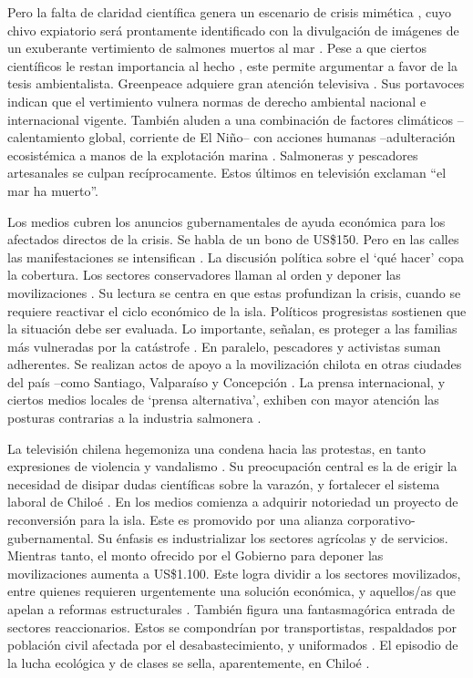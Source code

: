\documentclass{textolivre}
\begin{document}
Pero la falta de claridad científica genera un escenario de crisis mimética \cite{girard216}, 
cuyo chivo expiatorio será prontamente identificado con la divulgación de imágenes
de un exuberante vertimiento de salmones muertos al mar \cite{agenciaefe}. Pese a
que ciertos científicos le restan importancia al hecho \cite{buschmann2016}, este
permite argumentar a favor de la tesis ambientalista. Greenpeace adquiere gran atención
televisiva \cite{cnnchile2016b}. Sus portavoces indican que el vertimiento vulnera normas
de derecho ambiental nacional e internacional vigente. También aluden a una
combinación de factores climáticos --calentamiento global, corriente de El Niño-- con
acciones humanas --adulteración ecosistémica a manos de la explotación marina
\cite{Kamjunke2017}. Salmoneras y pescadores artesanales se culpan
recíprocamente. Estos últimos en televisión exclaman “el mar ha muerto”.

Los medios cubren los anuncios gubernamentales de ayuda económica para los
afectados directos de la crisis. Se habla de un bono de US\$150. Pero en las calles las
manifestaciones se intensifican \cite{24horasa,infante2016}. La discusión política
sobre el ‘qué hacer’ copa la cobertura. Los sectores conservadores llaman al orden y
deponer las movilizaciones \cite{agriculturatv}. Su lectura se centra en que estas
profundizan la crisis, cuando se requiere reactivar el ciclo económico de la isla. Políticos
progresistas sostienen que la situación debe ser evaluada. Lo importante, señalan, es
proteger a las familias más vulneradas por la catástrofe \cite{cooperativa2016}. En
paralelo, pescadores y activistas suman adherentes. Se realizan actos de apoyo a la
movilización chilota en otras ciudades del país --como Santiago, Valparaíso y Concepción
\cite{agenciaefe}. La prensa internacional, y ciertos medios locales de ‘prensa
alternativa’, exhiben con mayor atención las posturas contrarias a la industria salmonera
\cite{Mascareo2018b}.

La televisión chilena hegemoniza una condena hacia las protestas, en tanto
expresiones de violencia y vandalismo \cite{cabello2018}. Su
preocupación central es la de erigir la necesidad de disipar dudas científicas sobre la
varazón, y fortalecer el sistema laboral de Chiloé \cite{infante2016}. En los medios
comienza a adquirir notoriedad un proyecto de reconversión para la isla. Este es
promovido por una alianza corporativo-gubernamental. Su énfasis es industrializar los
sectores agrícolas y de servicios. Mientras tanto, el monto ofrecido por el Gobierno para
deponer las movilizaciones aumenta a US\$1.100. Este logra dividir a los sectores
movilizados, entre quienes requieren urgentemente una solución económica, y
aquellos/as que apelan a reformas estructurales \cite{quense}. También figura una
fantasmagórica entrada de sectores reaccionarios. Estos se compondrían por
transportistas, respaldados por población civil afectada por el desabastecimiento, y
uniformados \cite{decima2016,t13a}. El episodio de la lucha ecológica y de
clases se sella, aparentemente, en Chiloé \cite{Foster2016,ValdebenitoAllendes2018}.
\end{document}

